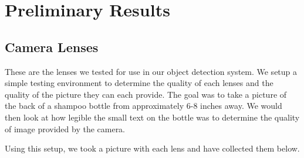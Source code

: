 \documentclass[letterpaper,12pt]{article}
\begin{document}


\section{Preliminary Results}
\subsection{Camera Lenses}


\medskip

These are the lenses we tested for use in our object detection system. We setup a simple testing environment to determine the quality of each lenses and the quality of the picture they can each provide. The goal was to take a picture of the back of a shampoo bottle from approximately 6-8 inches away. We would then look at how legible the small text on the bottle was to determine the quality of image provided by the camera.\par


\medskip

Using this setup, we took a picture with each lens and have collected them below.\par

\end{document}
